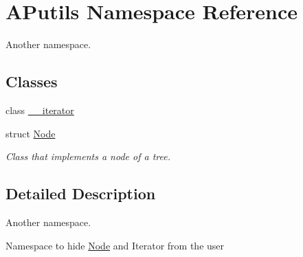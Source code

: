 \hypertarget{namespace_a_putils}{}\section{A\+Putils Namespace Reference}
\label{namespace_a_putils}


Another namespace.  


\subsection*{Classes}
\begin{DoxyCompactItemize}
\item 
class \hyperlink{class_a_putils_1_1____iterator}{\+\_\+\+\_\+iterator}
\item 
struct \hyperlink{struct_a_putils_1_1_node}{Node}
\begin{DoxyCompactList}\small\item\em Class that implements a node of a tree. \end{DoxyCompactList}\end{DoxyCompactItemize}


\subsection{Detailed Description}
Another namespace. 

Namespace to hide \hyperlink{struct_a_putils_1_1_node}{Node} and Iterator from the user 